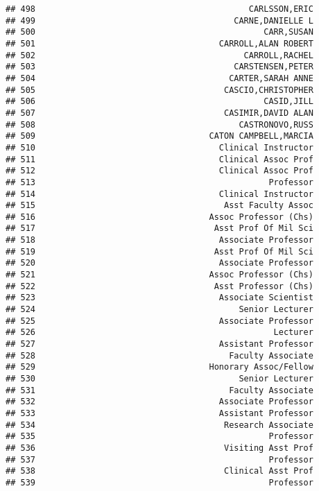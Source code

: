 \documentclass[
]{article}
\begin{document}
\begin{verbatim}
## 498                                           CARLSSON,ERIC
## 499                                        CARNE,DANIELLE L
## 500                                              CARR,SUSAN
## 501                                     CARROLL,ALAN ROBERT
## 502                                          CARROLL,RACHEL
## 503                                        CARSTENSEN,PETER
## 504                                       CARTER,SARAH ANNE
## 505                                      CASCIO,CHRISTOPHER
## 506                                              CASID,JILL
## 507                                      CASIMIR,DAVID ALAN
## 508                                         CASTRONOVO,RUSS
## 509                                   CATON CAMPBELL,MARCIA
## 510                                     Clinical Instructor
## 511                                     Clinical Assoc Prof
## 512                                     Clinical Assoc Prof
## 513                                               Professor
## 514                                     Clinical Instructor
## 515                                      Asst Faculty Assoc
## 516                                   Assoc Professor (Chs)
## 517                                    Asst Prof Of Mil Sci
## 518                                     Associate Professor
## 519                                    Asst Prof Of Mil Sci
## 520                                     Associate Professor
## 521                                   Assoc Professor (Chs)
## 522                                    Asst Professor (Chs)
## 523                                     Associate Scientist
## 524                                         Senior Lecturer
## 525                                     Associate Professor
## 526                                                Lecturer
## 527                                     Assistant Professor
## 528                                       Faculty Associate
## 529                                   Honorary Assoc/Fellow
## 530                                         Senior Lecturer
## 531                                       Faculty Associate
## 532                                     Associate Professor
## 533                                     Assistant Professor
## 534                                      Research Associate
## 535                                               Professor
## 536                                      Visiting Asst Prof
## 537                                               Professor
## 538                                      Clinical Asst Prof
## 539                                               Professor

\end{verbatim}
\end{document}
